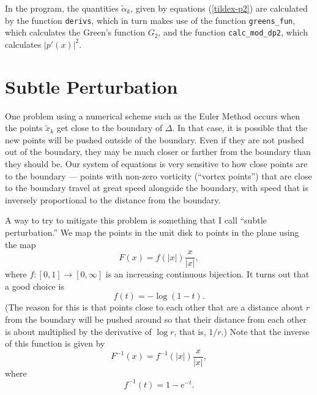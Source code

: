 \documentclass[12pt]{article}
\begin{document}
In the program, the quantities $\tilde\alpha_k$, given by
equations (\ref{tildex-p2}) are calculated by the function
{\tt derivs}, which in turn makes use of the function
{\tt greens\_fun}, which calculates the Green's function
$G_2$, and the function {\tt calc\_mod\_dp2}, which calculates
$|p'(x)|^2$.

\section{Subtle Perturbation}

One problem using a numerical scheme such as the Euler Method occurs
when the points $\tilde x_k$ get close to the boundary
of $\Delta$.  In that case, it is possible that the new
points will be pushed outside of the boundary.  Even if they 
are not pushed out of the boundary, they may be much closer
or farther from the boundary than they should be.  
Our system of equations is very sensitive to how close points
are to the boundary --- points with non-zero vorticity
(``vortex points'') that are close to the boundary travel
at great speed alongside the boundary, with speed that is
inversely proportional to the distance from the boundary.

A way to try to mitigate this problem is something that I call
``subtle perturbation.''
We map the points in 
the unit disk to points in the plane using the map
\begin{equation*}
F(x) = f(|x|) \frac x{|x|} ,
\end{equation*}
where $f:[0,1]\to[0,\infty]$ is an increasing continuous
bijection.  It turns out that a good choice is
\begin{equation*}
f(t) = -\log(1-t) .
\end{equation*}
(The reason for this is that points close to each other 
that are a distance
about $r$ from the boundary will be pushed around so that
their distance from each other is about multiplied by the
derivative of $\log r$, that is, $1/r$.)
Note that the inverse of this function is given by
\begin{equation*}
F^{-1}(x) = f^{-1}(|x|) \frac x{|x|} ,
\end{equation*}
where 
\begin{equation*}
f^{-1}(t) = 1-e^{-t} .
\end{equation*}
\end{document}
